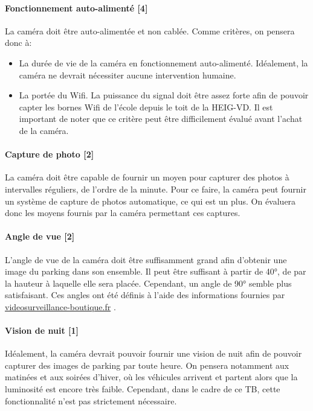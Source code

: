 \paragraph{Fonctionnement auto-alimenté [4]}
La caméra doit être auto-alimentée et non cablée. Comme critères, on pensera donc à:
\begin{itemize}
    \item La durée de vie de la caméra en fonctionnement auto-alimenté. Idéalement, la caméra ne devrait nécessiter aucune intervention humaine.
    \item La portée du Wifi. La puissance du signal doit être assez forte afin de pouvoir capter les bornes Wifi de l'école depuis le toit de la HEIG-VD. Il est important de noter que ce critère peut être difficilement évalué avant l'achat de la caméra.
\end{itemize}

\paragraph{Capture de photo [2]}
La caméra doit être capable de fournir un moyen pour capturer des photos à intervalles réguliers, de l'ordre de la minute. Pour ce faire, la caméra peut fournir un système de capture de photos automatique, ce qui est un plus. On évaluera donc les moyens fournis par la caméra permettant ces captures.

\paragraph{Angle de vue [2]}
L'angle de vue de la caméra doit être suffisamment grand afin d'obtenir une image du parking dans son ensemble. Il peut être suffisant à partir de 40°, de par la hauteur à laquelle elle sera placée. Cependant, un angle de 90° semble plus satisfaisant. Ces angles ont été définis à l'aide des informations fournies par \url{videosurveillance-boutique.fr} \autocite{cam:securite_info}.

\paragraph{Vision de nuit [1]}
Idéalement, la caméra devrait pouvoir fournir une vision de nuit afin de pouvoir capturer des images de parking par toute heure. On pensera notamment aux matinées et aux soirées d'hiver, où les véhicules arrivent et partent alors que la luminosité est encore très faible. Cependant, dans le cadre de ce TB, cette fonctionnalité n'est pas strictement nécessaire.

